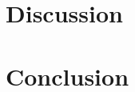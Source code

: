 \documentclass[prb,preprint]{revtex4-1}
\begin{document}
\section{Discussion}

\section{Conclusion}

 
\begin{thebibliography}{3}


\end{thebibliography}
\end{document}
